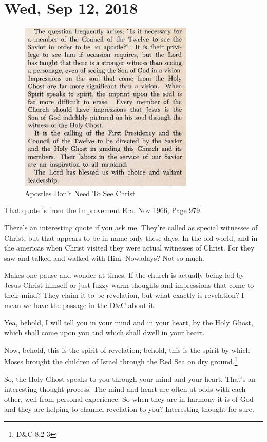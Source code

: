 \section{Wed, Sep 12, 2018}

\begin{figure}[h!]
  \centering
  \includegraphics[width=.5\linewidth]{2018/images/apostle.png}
  \caption{Apostles Don't Need To See Christ}
  \label{fig:apostle}
\end{figure}

That quote is from the Improvement Era, Nov 1966, Page 979.

There's an interesting quote if you ask me. They're called as special witnesses of
Christ, but that appears to be in name only these days. In the old world, and in the
americas when Christ visited they were actual witnesses of Christ. For they saw and
talked and walked with Him. Nowadays? Not so much.

Makes one pause and wonder at times. If the church is actually being led by Jesus
Christ himself or just fuzzy warm thoughts and impressions that come to their mind?
They claim it to be revelation, but what exactly is revelation? I mean we have the
passage in the D\&C about it.

\begin{displayquote}
Yea, behold, I will tell you in your mind and in your heart, by the Holy Ghost, 
which shall come upon you and which shall dwell in your heart.

Now, behold, this is the spirit of revelation; behold, this is the spirit by which 
Moses brought the children of Israel through the Red Sea on dry ground.\footnote{
D\&C 8:2-3
}
\end{displayquote}

So, the Holy Ghost speaks to you through your mind and your heart. That's an
interesting thought process. The mind and heart are often at odds with each other,
well from personal experience. So when they are in harmony it is of God and they are
helping to channel revelation to you? Interesting thought for sure.